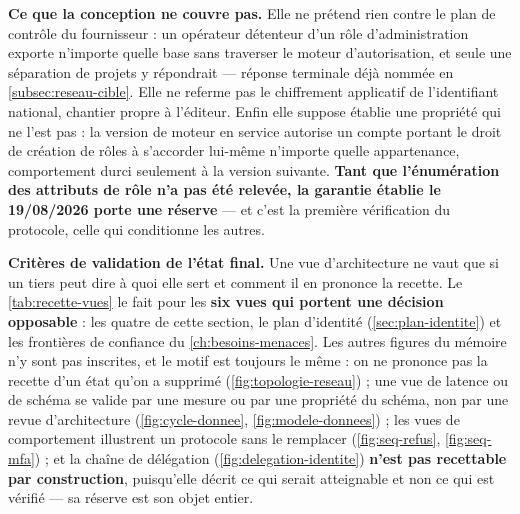 \medskip
\noindent\textbf{Ce que la conception ne couvre pas.}
Elle ne prétend rien contre le plan de contrôle du fournisseur : un opérateur détenteur d'un rôle
d'administration exporte n'importe quelle base sans traverser le moteur d'autorisation, et seule
une séparation de projets y répondrait --- réponse terminale déjà nommée en
\cref{subsec:reseau-cible}. Elle ne referme pas le chiffrement applicatif de l'identifiant
national, chantier propre à l'éditeur. Enfin elle suppose établie une propriété qui ne l'est pas :
la version de moteur en service autorise un compte portant le droit de création de rôles à
s'accorder lui-même n'importe quelle appartenance, comportement durci seulement à la version
suivante. \textbf{Tant que l'énumération des attributs de rôle n'a pas été relevée, la garantie
établie le 19/08/2026 porte une réserve} --- et c'est la première vérification du protocole, celle
qui conditionne les autres.

\medskip
\noindent\textbf{Critères de validation de l'état final.}
Une vue d'architecture ne vaut que si un tiers peut dire à quoi elle sert et comment il en prononce
la recette. Le \cref{tab:recette-vues} le fait pour les \textbf{six vues qui portent une décision
opposable} : les quatre de cette section, le plan d'identité (\cref{sec:plan-identite}) et les
frontières de confiance du \cref{ch:besoins-menaces}. Les autres figures du mémoire n'y sont pas inscrites, et le
motif est toujours le même : on ne prononce pas la recette d'un état qu'on a supprimé
(\cref{fig:topologie-reseau}) ; une vue de latence ou de schéma se valide par une mesure ou par une
propriété du schéma, non par une revue d'architecture (\cref{fig:cycle-donnee},
\cref{fig:modele-donnees}) ; les vues de comportement illustrent un protocole sans le remplacer
(\cref{fig:seq-refus}, \cref{fig:seq-mfa}) ; et la chaîne de délégation
(\cref{fig:delegation-identite}) \textbf{n'est pas recettable par construction}, puisqu'elle décrit
ce qui serait atteignable et non ce qui est vérifié --- sa réserve est son objet entier.

